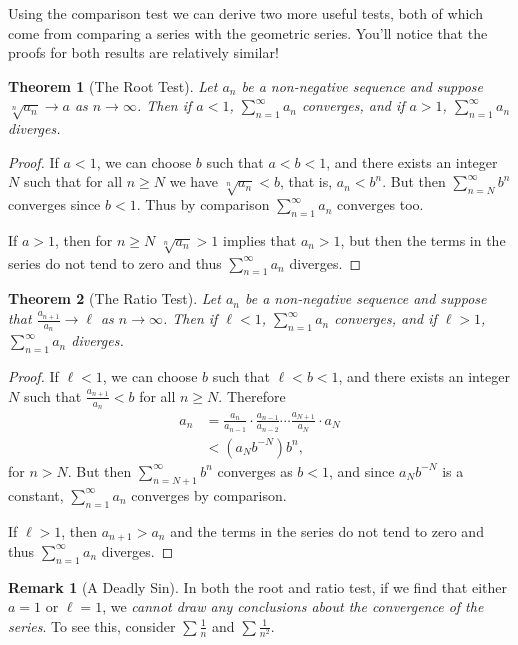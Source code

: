 \documentclass[11pt, a4paper]{article}
\newtheorem{theorem}{Theorem}[section]
\theoremstyle{definition}
\newtheorem*{remark}{Remark}
\begin{document}
Using the comparison test we can derive two more useful tests, both of which come from comparing a series with the geometric series. You'll notice that the proofs for both results are relatively similar!

\begin{theorem}[The Root Test]
	Let $a_n$ be a non-negative sequence and suppose $\sqrt[n]{a_n} \rightarrow a$ as $n \rightarrow \infty$.
	Then if $a < 1$, $\sum_{n = 1}^{\infty} a_n$ converges, and if $a > 1$, $\sum_{n = 1}^{\infty} a_n$ diverges.
\end{theorem}
\begin{proof}
	If $a < 1$, we can choose $b$ such that $a < b < 1$, and there exists an integer $N$ such that for all $n \geq N$ we have $\sqrt[n]{a_n} < b$, that is, $a_n < b^n$. But then $\sum_{n = N}^{\infty} b^n$ converges since $b < 1$. Thus by comparison $\sum_{n = 1}^{\infty} a_n$ converges too.

	If $a > 1$, then for $n \geq N$ $\sqrt[n]{a_n} > 1$ implies that $a_n > 1$, but then the terms in the series do not tend to zero and thus $\sum_{n = 1}^{\infty} a_n$ diverges.
\end{proof}


\begin{theorem}[The Ratio Test]
	Let $a_n$ be a non-negative sequence and suppose that $\frac{a_{n + 1}}{a_n} \rightarrow \ell$ as $n \rightarrow \infty$. Then if $\ell < 1$, $\sum_{n = 1}^{\infty} a_n$ converges, and if $\ell > 1$, $\sum_{n = 1}^{\infty} a_n$ diverges.
\end{theorem}
\begin{proof}
	If $\ell < 1$, we can choose $b$ such that $\ell < b < 1$, and there exists an integer $N$ such that $\frac{a_{n + 1}}{a_n} < b$ for all $n \geq N$. Therefore
	\begin{align*}
		a_n &= \frac{a_n}{a_{n - 1}} \cdot \frac{a_{n - 1}}{a_{n - 2}} \cdots \frac{a_{N + 1}}{a_{N}}\cdot a_N \\
		&< \left(a_N b^{-N}\right)b^{n},
	\end{align*}
	for $n > N$. But then $\sum_{n = N+1}^{\infty} b^n$ converges as $b < 1$, and since $a_N b^{-N}$ is a constant, $\sum_{n = 1}^{\infty} a_n$ converges by comparison.

	If $\ell > 1$, then $a_{n + 1} > a_n$ and the terms in the series do not tend to zero and thus $\sum_{n = 1}^{\infty} a_n$ diverges. 
\end{proof}
\begin{remark}[A Deadly Sin]
	In both the root and ratio test, if we find that either $a = 1$ or $\ell = 1$, we \emph{cannot draw any conclusions about the convergence of the series}. To see this, consider $\sum \frac{1}{n}$ and $\sum \frac{1}{n^2}$.
\end{remark}
\end{document}
